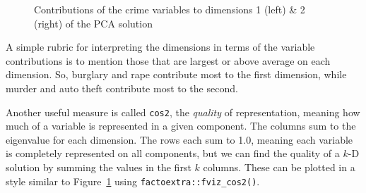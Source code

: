 \documentclass[
  letterpaper,
  10pt,
  krantz2]{krantz}
\begin{document}
\begin{figure}[H]


\caption{\label{fig-fviz-contrib}Contributions of the crime variables to
dimensions 1 (left) \& 2 (right) of the PCA solution}

\end{figure}%

A simple rubric for interpreting the dimensions in terms of the variable
contributions is to mention those that are largest or above average on
each dimension. So, burglary and rape contribute most to the first
dimension, while murder and auto theft contribute most to the second.

Another useful measure is called \texttt{cos2}, the \emph{quality} of
representation, meaning how much of a variable is represented in a given
component. The columns sum to the eigenvalue for each dimension. The
rows each sum to 1.0, meaning each variable is completely represented on
all components, but we can find the quality of a \(k\)-D solution by
summing the values in the first \(k\) columns. These can be plotted in a
style similar to Figure~\ref{fig-fviz-contrib} using
\texttt{factoextra::fviz\_cos2()}.
\end{document}
